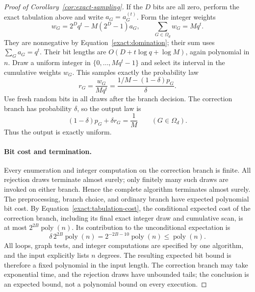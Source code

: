 \begin{proof}[Proof of Corollary~\ref{cor:exact-sampling}]
If the $D$ bits are all zero, perform the exact tabulation above and
write $a_G=a_G^{(t)}$. Form the integer weights
\begin{equation}\label{exact:weights}
 w_G=2^Dq^t-M(2^D-1)a_G,
 \qquad
 \sum_{G\in\Omega_d}w_G=Mq^t.
\end{equation}
They are nonnegative by Equation~\eqref{exact:domination}; their sum
uses $\sum_Ga_G=q^t$. Their bit lengths are
$O(D+t\log q+\log M)$, again polynomial in $n$. Draw a uniform
integer in $\{0,\ldots,Mq^t-1\}$ and select its interval in the
cumulative weights $w_G$. This samples exactly the probability law
\[
 r_G=\frac{w_G}{Mq^t}
     =\frac{1/M-(1-\delta)p_G}{\delta}.
\]
Use fresh random bits in all draws after the branch decision.
The correction branch has probability $\delta$, so the output law is
\begin{equation}\label{exact:mixture}
 (1-\delta)p_G+\delta r_G=\frac1M
 \qquad(G\in\Omega_d).
\end{equation}
Thus the output is exactly uniform.

\paragraph{Bit cost and termination.}
Every enumeration and integer computation on the correction branch
is finite. All rejection draws terminate almost surely; only finitely
many such draws are invoked on either branch. Hence the complete
algorithm terminates almost surely. The preprocessing, branch choice,
and ordinary branch have expected polynomial bit cost. By
Equation~\eqref{exact:tabulation-cost}, the conditional expected cost
of the correction branch, including its final exact integer draw and
cumulative scan, is at most $2^{2B}\operatorname{poly}(n)$. Its
contribution to the unconditional expectation is
\[
 \delta\,2^{2B}\operatorname{poly}(n)
 =2^{-2B-10}\operatorname{poly}(n)
 \le\operatorname{poly}(n).
\]
All loops, graph tests, and integer computations are specified by one
algorithm, and the input explicitly lists $n$ degrees. The resulting
expected bit bound is therefore a fixed polynomial in the input
length. The correction branch may take exponential time, and the
rejection draws have unbounded tails; the conclusion is an expected
bound, not a polynomial bound on every execution.
\end{proof}
